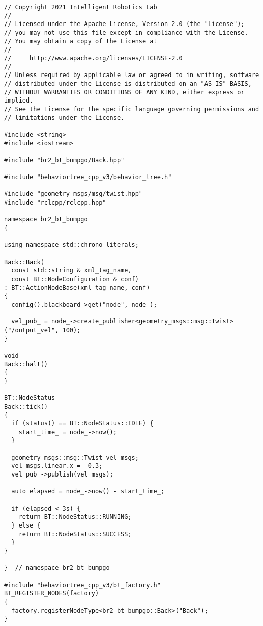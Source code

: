  \footnotesize
\begin{tcolorbox}[sharp corners, colframe=gray!80, colback=LightGray, left=0pt, top=0pt, bottom=0pt, title=\texttt{br2\_bt\_bumpgo/src/br2\_bt\_bumpgo/Back.cpp}]
  \begin{verbatim}
// Copyright 2021 Intelligent Robotics Lab
//
// Licensed under the Apache License, Version 2.0 (the "License");
// you may not use this file except in compliance with the License.
// You may obtain a copy of the License at
//
//     http://www.apache.org/licenses/LICENSE-2.0
//
// Unless required by applicable law or agreed to in writing, software
// distributed under the License is distributed on an "AS IS" BASIS,
// WITHOUT WARRANTIES OR CONDITIONS OF ANY KIND, either express or implied.
// See the License for the specific language governing permissions and
// limitations under the License.

#include <string>
#include <iostream>

#include "br2_bt_bumpgo/Back.hpp"

#include "behaviortree_cpp_v3/behavior_tree.h"

#include "geometry_msgs/msg/twist.hpp"
#include "rclcpp/rclcpp.hpp"

namespace br2_bt_bumpgo
{

using namespace std::chrono_literals;

Back::Back(
  const std::string & xml_tag_name,
  const BT::NodeConfiguration & conf)
: BT::ActionNodeBase(xml_tag_name, conf)
{
  config().blackboard->get("node", node_);

  vel_pub_ = node_->create_publisher<geometry_msgs::msg::Twist>("/output_vel", 100);
}

void
Back::halt()
{
}

BT::NodeStatus
Back::tick()
{
  if (status() == BT::NodeStatus::IDLE) {
    start_time_ = node_->now();
  }

  geometry_msgs::msg::Twist vel_msgs;
  vel_msgs.linear.x = -0.3;
  vel_pub_->publish(vel_msgs);

  auto elapsed = node_->now() - start_time_;

  if (elapsed < 3s) {
    return BT::NodeStatus::RUNNING;
  } else {
    return BT::NodeStatus::SUCCESS;
  }
}

}  // namespace br2_bt_bumpgo

#include "behaviortree_cpp_v3/bt_factory.h"
BT_REGISTER_NODES(factory)
{
  factory.registerNodeType<br2_bt_bumpgo::Back>("Back");
}
    \end{verbatim}
    \end{tcolorbox}
  \normalsize

